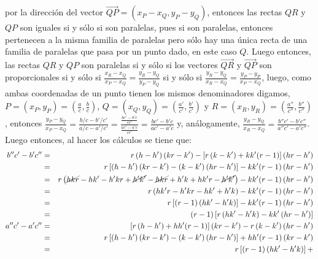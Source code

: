 \begin{solucion}
 por la direcci\'on del vector
 $\overrightarrow{QP} = \left( x_P-x_Q, y_P-y_Q \right)$,
 entonces las rectas $QR$ y $QP$ son iguales si y s\'olo si son paralelas,
 pues si son paralelas, entonces pertenecen a la misma familia de paralelas
 pero s\'olo hay una \'unica recta de una familia de paralelas que pasa
 por un punto dado, en este caso $Q$.
 Luego entonces, las rectas $QR$ y $QP$ son paralelas
 si y s\'olo si los vectores
 $\overrightarrow{QR}$ y $\overrightarrow{QP}$ son proporcionales
 si y s\'olo si $\frac{x_R-x_Q}{x_P-x_Q} = \frac{y_R-y_Q}{y_P-y_Q}$
 si y s\'olo si $\frac{y_R-y_Q}{x_R-x_Q} = \frac{y_P-y_P}{x_P-x_Q}$,
 luego, como ambas coordenadas de un punto tienen los mismos denominadores
 digamos,
 $P=\left( x_P, y_P \right) = \left( \frac{a}{c},\frac{b}{c} \right)$,
 $Q=\left( x_Q, y_Q \right) = \left( \frac{a'}{c'},\frac{b'}{c'} \right)$ y
 $R=\left( x_R,y_R\right) =\left( \frac{a''}{c''},\frac{b''}{c''} \right)$,
 entonces $\frac{y_P-y_Q}{x_P-x_Q} = \frac{b/c-b'/c'}{a/c-a'/c'}
 = \frac{\frac{bc'-b'c}{cc'}}{\frac{ac'-a'c}{cc'}}
 = \frac{bc'-b'c}{ac'-a'c}$
 y, an\'alogamente,
 $\frac{y_R-y_Q}{x_R-x_Q} = \frac{b''c'-b'c''}{a''c'-a'c''}$.
 Luego entonces, al hacer los c\'alculos se tiene que:
 \begin{eqnarray*}
  b''c'-b'c'' & = &
  r\left( h-h' \right)\left( kr - k' \right) -
  \left[ r\left( k-k' \right) + kk'(r-1) \right]\left( hr-h' \right) \\
  & = & r\left[ \left( h-h' \right)\left( kr-k' \right) -
  \left( k-k' \right)\left( hr-h' \right) \right] -
  kk'(r-1)\left( hr - h' \right) \\
  & = & r\left( \cancel{hkr} - hk' - h'kr + \cancel{h'k'} - \cancel{hkr} + h'k + hk'r - \cancel{h'k'} \right)
  - kk'(r-1)\left( hr - h' \right) \\
  & = & r\left( hk'r - h'kr - hk' + h'k  \right) 
  - kk'(r-1)\left( hr - h' \right) \\
  & = & r\left[ (r-1)\left( hk' - h'k \right) \right]
  - kk'(r-1)\left( hr - h' \right) \\
  & = & (r-1)\left[ r\left( hk'-h'k\right)-kk'\left( hr-h'\right)\right] \\
  a''c'-a'c'' & = &
  \left[ r\left( h-h' \right) + hh'(r-1) \right]\left( kr-k' \right) - 
  r\left( k-k' \right)\left( hr - h' \right) \\
  & = & r \left[ \left( h-h' \right)\left( kr-k' \right) - 
  \left( k-k' \right)\left( hr - h' \right) \right] +
  hh'(r-1)\left( kr - k' \right) \\
  & = & r\left[ (r-1)\left( hk' - h'k \right) \right] +

\end{eqnarray*}
\end{solucion}
